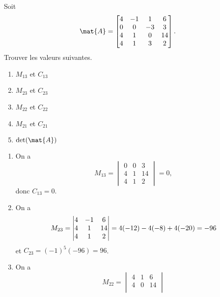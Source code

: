 \begin{exercice}
  Soit
  \begin{displaymath}
    \mat{A} =
    \begin{bmatrix}
      4 & -1 &  1 &  6 \\
      0 &  0 & -3 &  3 \\
      4 &  1 &  0 & 14 \\
      4 &  1 &  3 &  2
    \end{bmatrix}.
  \end{displaymath}
  Trouver les valeurs suivantes.
  \begin{enumerate}
  \item $M_{13}$ et $C_{13}$
  \item $M_{23}$ et $C_{23}$
  \item $M_{22}$ et $C_{22}$
  \item $M_{21}$ et $C_{21}$
  \item $\det(\mat{A})$
  \end{enumerate}
  \begin{sol}
    \begin{enumerate}
    \item On a
      \begin{displaymath}
        M_{13}
        =
        \begin{vmatrix}
          0 &  0 &  3 \\
          4 &  1 & 14 \\
          4 &  1 &  2
        \end{vmatrix}
        = 0,
      \end{displaymath}
      donc $C_{13} = 0$.
    \item On a
      \begin{displaymath}
        M_{23}
        =
        \begin{vmatrix}
          4 & -1 &  6 \\
          4 &  1 & 14 \\
          4 &  1 &  2
        \end{vmatrix}
        = 4(-12) - 4(-8) + 4(-20) \\
        = -96
      \end{displaymath}
      et $C_{23} = (-1)^5 (-96) = 96$.
    \item On a
      \begin{displaymath}
        M_{22}
        =
        \begin{vmatrix}
          4 &  1 &  6 \\
          4 &  0 & 14 \\

\end{vmatrix}
\end{displaymath}
\end{enumerate}
\end{sol}
\end{exercice}
